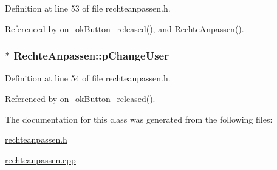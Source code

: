 Definition at line 53 of file rechteanpassen.h.

Referenced by on\_\-okButton\_\-released(), and RechteAnpassen().\hypertarget{class_rechte_anpassen_1a965add1d62f33e2e0c7f8c5bc414fc}{
\subsubsection[pChangeUser]{$\ast$ {\bf RechteAnpassen::pChangeUser}}}
\label{class_rechte_anpassen_1a965add1d62f33e2e0c7f8c5bc414fc}




Definition at line 54 of file rechteanpassen.h.

Referenced by on\_\-okButton\_\-released().

The documentation for this class was generated from the following files:\begin{CompactItemize}
\item 
\hyperlink{rechteanpassen_8h}{rechteanpassen.h}\item 
\hyperlink{rechteanpassen_8cpp}{rechteanpassen.cpp}\end{CompactItemize}
